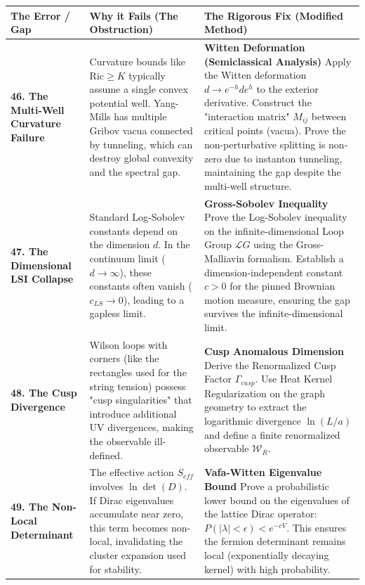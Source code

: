 \begin{longtable}{|p{}|p{}|p{}|}
\hline
\textbf{The Error / Gap} & \textbf{Why it Fails (The Obstruction)} & \textbf{The Rigorous Fix (Modified Method)} \\
\hline
\textbf{46. The Multi-Well Curvature Failure} & Curvature bounds like $\text{Ric} \ge K$ typically assume a single convex potential well. Yang-Mills has multiple Gribov vacua connected by tunneling, which can destroy global convexity and the spectral gap. & \textbf{Witten Deformation (Semiclassical Analysis)} \newline Apply the Witten deformation $d \to e^{-h} d e^{h}$ to the exterior derivative. Construct the "interaction matrix" $M_{ij}$ between critical points (vacua). Prove the non-perturbative splitting is non-zero due to instanton tunneling, maintaining the gap despite the multi-well structure. \\
\hline
\textbf{47. The Dimensional LSI Collapse} & Standard Log-Sobolev constants depend on the dimension $d$. In the continuum limit ($d \to \infty$), these constants often vanish ($c_{LS} \to 0$), leading to a gapless limit. & \textbf{Gross-Sobolev Inequality} \newline Prove the Log-Sobolev inequality on the infinite-dimensional Loop Group $\mathcal{L}G$ using the Gross-Malliavin formalism. Establish a dimension-independent constant $c > 0$ for the pinned Brownian motion measure, ensuring the gap survives the infinite-dimensional limit. \\
\hline
\textbf{48. The Cusp Divergence} & Wilson loops with corners (like the rectangles used for the string tension) possess "cusp singularities" that introduce additional UV divergences, making the observable ill-defined. & \textbf{Cusp Anomalous Dimension} \newline Derive the Renormalized Cusp Factor $\Gamma_{cusp}$. Use Heat Kernel Regularization on the graph geometry to extract the logarithmic divergence $\ln(L/a)$ and define a finite renormalized observable $\mathcal{W}_R$. \\
\hline
\textbf{49. The Non-Local Determinant} & The effective action $S_{eff}$ involves $\ln \det(D)$. If Dirac eigenvalues accumulate near zero, this term becomes non-local, invalidating the cluster expansion used for stability. & \textbf{Vafa-Witten Eigenvalue Bound} \newline Prove a probabilistic lower bound on the eigenvalues of the lattice Dirac operator: $P(|\lambda| < \epsilon) < e^{-c V}$. This ensures the fermion determinant remains local (exponentially decaying kernel) with high probability. \\

\end{longtable}
